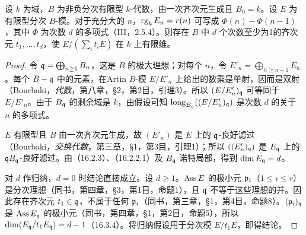 设 $k$ 为域，$B$ 为非负分次有限型 $k$-代数，由一次齐次元生成且 $B_0=k$。设 $E$ 为有限型分次 $B$-模。对于充分大的 $n$，$\operatorname{rg}_kE_n=r(n)$ 可写成 $\Phi(n)-\Phi(n-1)$，其中 $\Phi$ 为次数 $d$ 的多项式（III，2.5.4）。则存在 $B$ 中 $d$ 个次数至少为1的齐次元 $t_1,\ldots,t_d$，使 $E/(\sum_i t_iE)$ 在 $k$ 上有限维。
\begin{proof}
令 $\mathfrak q=\bigoplus_{n\geq1}B_n$，这是 $B$ 的极大理想；对每个 $n$，令 $E'_n=\bigoplus_{h\geq n+1}E_h$。每个 $B-\mathfrak q$ 中的元素，在Artin $B$-模 $E/E'_n$ 上给出的数乘是单射，因而是双射（Bourbaki，\textit{代数}，第八章，§2，第2目，引理3）。所以 $(E/E'_n)_{\mathfrak q}$ 可等同于 $E/E'_n$。由于 $B_{\mathfrak q}$ 的剩余域是 $k$，由假设可知 $\operatorname{long}_{B_{\mathfrak q}}((E/E'_n)_{\mathfrak q})$ 是次数 $d$ 的关于 $n$ 的多项式。

$E$ 有限型且 $B$ 由一次齐次元生成，故 $(E'_n)$ 是 $E$ 上的 $\mathfrak q$-良好滤过（Bourbaki，\textit{交换代数}，第三章，§1，第3目，引理1）；所以 $((E'_n)_{\mathfrak q})$ 是 $E_{\mathfrak q}$ 上的 $\mathfrak q B_{\mathfrak q}$-良好滤过。由（16.2.3）、（16.2.2.1）及 $B_{\mathfrak q}$ 诺特局部，得到 $\dim E_{\mathfrak q}=d$。

对 $d$ 作归纳，$d=0$ 时结论直接成立。设 $d\geq1$。$\operatorname{Ass} E$ 的极小元 $\mathfrak p_i$（$1\leq i\leq r$）是分次理想（同书，第四章，§3，第1目，命题1），且 $\mathfrak q$ 不等于这些理想的并。因此存在齐次元 $t_1\in\mathfrak q$，不属于任何 $\mathfrak p_i$（同书，第三章，§1，第4目，命题8）。$(\mathfrak p_i)_{\mathfrak q}$ 是 $\operatorname{Ass} E_{\mathfrak q}$ 的极小元（同书，第四章，§1，第2目，命题5），所以
$\dim(E_{\mathfrak q}/t_1E_{\mathfrak q})=d-1$（16.3.4）。将归纳假设用于分次模 $E/t_1E$，即得结论。
\end{proof}
